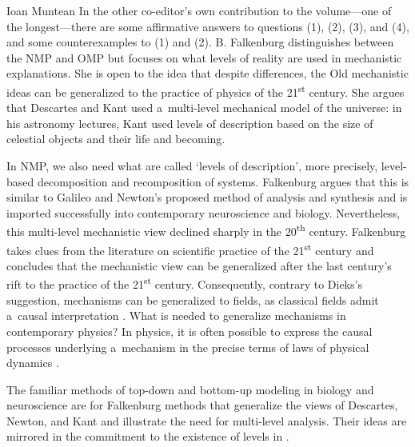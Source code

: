 \begin{recengenv}{Ioan Muntean}
In the other co-editor's own contribution to the volume---one of the longest---there are some affirmative answers to questions (1), (2), (3), and (4), and some counterexamples to (1) and (2). B. Falkenburg distinguishes between the NMP and OMP but focuses on what levels of reality are used in mechanistic explanations. She is open to the idea that despite differences, the Old mechanistic ideas can be generalized to the practice of physics of the 21\textsuperscript{st} century. She argues that Descartes and Kant used a~multi-level mechanical model of the universe: in his astronomy lectures, Kant used levels of description based on the size of celestial objects and their life and becoming.

In NMP, we also need what are called ‘levels of description', more precisely, level-based decomposition and recomposition of systems. Falkenburg argues that this is similar to Galileo and Newton's proposed method of analysis and synthesis and is imported successfully into contemporary neuroscience and biology. Nevertheless, this multi-level mechanistic view declined sharply in the 20\textsuperscript{th} century. Falkenburg takes clues from the literature on scientific practice of the 21\textsuperscript{st} century and concludes that the mechanistic view can be generalized after the last century's rift to the practice of the 21\textsuperscript{st} century. Consequently, contrary to Dieks's suggestion, mechanisms can be generalized to fields, as classical fields admit a~causal interpretation
\parencites[][p.239]{salmon_scientific_1984}[referred at:][p.72]{falkenburg_mechanistic_2019}. %
 What is needed to generalize mechanisms in contemporary physics? In physics, it is often possible to express the causal processes underlying a~mechanism in the precise terms of laws of physical dynamics 
\parencite*[][p.73]{falkenburg_mechanistic_2019}.%


The familiar methods of top-down and bottom-up modeling in biology and neuroscience are for Falkenburg methods that generalize the views of Descartes, Newton, and Kant and illustrate the need for multi-level analysis. Their ideas are mirrored in the commitment to the existence of levels in \parencite{machamer_thinking_2000}.


\end{recengenv}
